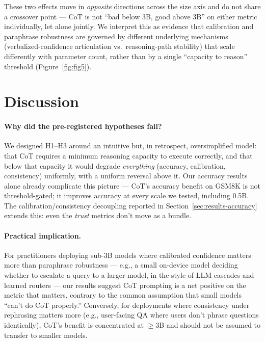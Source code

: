 \documentclass{article}
\begin{document}
These two effects move in \emph{opposite} directions across the size axis and do not share a crossover point --- CoT is not ``bad below 3B, good above 3B'' on either metric individually, let alone jointly. We interpret this as evidence that calibration and paraphrase robustness are governed by different underlying mechanisms (verbalized-confidence articulation vs.\ reasoning-path stability) that scale differently with parameter count, rather than by a single ``capacity to reason'' threshold (Figure~\ref{fig:fig5}).

\section{Discussion}
\label{sec:discussion}

\paragraph{Why did the pre-registered hypotheses fail?} We designed H1--H3 around an intuitive but, in retrospect, oversimplified model: that CoT requires a minimum reasoning capacity to execute correctly, and that below that capacity it would degrade \emph{everything} (accuracy, calibration, consistency) uniformly, with a uniform reversal above it. Our accuracy results alone already complicate this picture --- CoT's accuracy benefit on GSM8K is not threshold-gated; it improves accuracy at every scale we tested, including 0.5B. The calibration/consistency decoupling reported in Section~\ref{sec:results-accuracy} extends this: even the \emph{trust} metrics don't move as a bundle.

\paragraph{Practical implication.} For practitioners deploying sub-3B models where calibrated confidence matters more than paraphrase robustness --- e.g., a small on-device model deciding whether to escalate a query to a larger model, in the style of LLM cascades and learned routers \citep{chen2023frugalgpt,ong2024routellm,ding2024hybridllm} --- our results suggest CoT prompting is a net positive on the metric that matters, contrary to the common assumption that small models ``can't do CoT properly.'' Conversely, for deployments where consistency under rephrasing matters more (e.g., user-facing QA where users don't phrase questions identically), CoT's benefit is concentrated at $\geq$3B and should not be assumed to transfer to smaller models.
\end{document}

